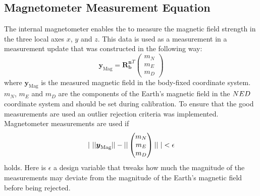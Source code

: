 \subsection{Magnetometer Measurement Equation}
The internal magnetometer enables the \abbrROV to measure the magnetic field strength in the three local axes $x$, $y$ and $z$. This data is used as a measurement in a measurement update that was constructed in the following way:
\begin{equation}
\boldsymbol{y}_{\text{Mag}} = 
    \boldsymbol{R^n_b}^T
    \begin{pmatrix}
        m_N\\
        m_E\\
        m_D
    \end{pmatrix}
\end{equation}
where $\boldsymbol{y}_{\text{Mag}}$ is the measured magnetic field in the body-fixed coordinate system. $m_N$, $m_E$ and $m_D$ are the components of the Earth's magnetic field in the $NED$ coordinate system and should be set during calibration.
To ensure that the good measurements are used an outlier rejection criteria was implemented. Magnetometer measurements are used if 
\begin{equation}
        |~||
\boldsymbol{y}_{\text{Mag}}||
    -
    ||
    \begin{pmatrix}
        m_N\\
        m_E\\
        m_D
    \end{pmatrix}||
     ~| < \epsilon
\end{equation}
holds. Here is $\epsilon$ a design variable that tweaks how much the magnitude of the measurements may deviate from the magnitude of the Earth's magnetic field before being rejected.

